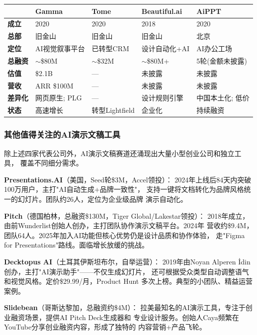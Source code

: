 \begin{keybox}[AI演示文稿赛道对比]
\small
\begin{tabularx}{\textwidth}{l X X X X}
\toprule
\rowcolor{figLightGray}
& \textbf{Gamma} & \textbf{Tome} & \textbf{Beautiful.ai} & \textbf{AiPPT} \\
\midrule
\textbf{成立} & 2020 & 2020 & 2018 & 2020 \\
\textbf{总部} & 旧金山 & 旧金山 & 旧金山 & 北京 \\
\textbf{定位} & AI视觉叙事平台 & 已转型CRM & 设计自动化+AI & AI办公工场 \\
\textbf{总融资} & $\sim$\$80M & $\sim$\$32M & $\sim$\$80M+ & 5轮(金额未披露) \\
\textbf{估值} & \$2.1B & --- & 未披露 & 未披露 \\
\textbf{营收} & ARR \$100M & --- & 未披露 & 未披露 \\
\textbf{差异化} & 网页原生; PLG & --- & 设计规则引擎 & 中国本土化; 低价 \\
\textbf{状态} & 高速增长 & 转型Lightfield & 企业化 & 持续融资 \\
\bottomrule
\end{tabularx}
\end{keybox}

\subsubsection{其他值得关注的AI演示文稿工具}

除上述四家代表公司外，AI演示文稿赛道还涌现出大量小型创业公司和独立工具，
覆盖不同细分需求。

\textbf{Presentations.AI}（美国，Seed轮\$3M，Accel领投）：
2024年上线后84天内突破100万用户，主打"AI自动生成+品牌一致性"，
支持一键将文档转化为品牌风格统一的幻灯片。团队约26人，定位为企业级品牌
演示自动化。

\textbf{Pitch}（德国柏林，总融资\$130M，Tiger Global/Lakestar领投）：
2018年成立，由前Wunderlist创始人创办，主打团队协作演示文稿平台。2024年
营收约\$9.4M，团队64人。2025年加入AI功能但核心优势仍是设计品质和协作体验，
走"Figma for Presentations"路线。面临增长放缓的挑战。

\textbf{Decktopus AI}（土耳其伊斯坦布尔，自举运营）：
2019年由Noyan Alperen İdin创办，主打"AI演示助手"——不仅生成幻灯片，
还可根据受众类型自动调整语气和视觉风格。定价\$29.99/月，Product Hunt
多次上榜。典型的小团队、精益运营案例。

\textbf{Slidebean}（哥斯达黎加，总融资约\$4M）：
拉美最知名的AI演示工具，专注于创业融资场景，提供AI Pitch Deck生成器和
专业设计服务。创始人Caya频繁在YouTube分享创业融资内容，形成了独特的
内容营销+产品飞轮。

